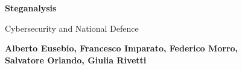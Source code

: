 \documentclass{article}
\begin{document}
    \begin{center}
        \Large
        \textbf{Steganalysis}
            
        \vspace{0.4cm}
        \large
        Cybersecurity and National Defence
            
        \vspace{0.4cm}
        \textbf{Alberto Eusebio, Francesco Imparato, Federico Morro,\\
        Salvatore Orlando, Giulia Rivetti}
        
        \vspace{1cm}
    \end{center}

    

    \begin{small}
        \tableofcontents

        \pagebreak
    
        
        
        
        
    \end{small}

    \pagebreak

    \printbibliography
\end{document}
